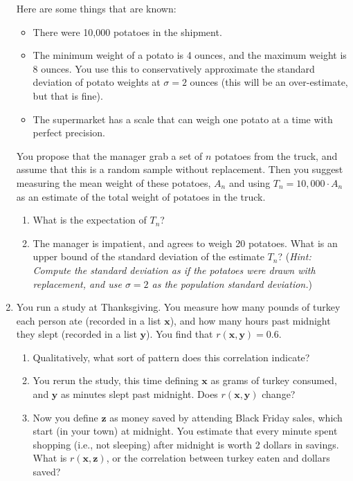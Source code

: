 \documentclass[11pt]{article}
\begin{document}
\begin{enumerate}
Here are some things that are known:
\begin{itemize}
\item There were 10,000 potatoes in the shipment.
\item The minimum weight of a potato is 4 ounces, and the maximum weight is 8 ounces. You use this to conservatively approximate the standard deviation of potato weights at $\sigma = 2$ ounces (this will be an over-estimate, but that is fine).
\item The supermarket has a scale that can weigh one potato at a time with perfect precision.
\end{itemize}

You propose that the manager grab a set of $n$ potatoes from the truck, and assume that this is a random sample without replacement. Then you suggest measuring the mean weight of these potatoes, $A_n$ and using $T_n = 10,000 \cdot A_n$ as an estimate of the total weight of potatoes in the truck.

\begin{enumerate}
\item What is the expectation of $T_n$?
\item The manager is impatient, and agrees to weigh 20 potatoes. What is an upper bound of the standard deviation of the estimate $T_n$? (\emph{Hint: Compute the standard deviation as if the potatoes were drawn with replacement, and use $\sigma = 2$ as the population standard deviation.})
\end{enumerate}

\item You run a study at Thanksgiving. You measure how many pounds of turkey each person ate (recorded in a list $\bm x$), and how many hours past midnight they slept (recorded in a list $\bm y$). You find that $r(\bm x, \bm y) = 0.6$.
\begin{enumerate}
\item Qualitatively, what sort of pattern does this correlation indicate?
\item You rerun the study, this time defining $\bm x$ as grams of turkey consumed, and $\bm y$ as minutes slept past midnight. Does $r(\bm x, \bm y)$ change?
\item Now you define $\bm z$ as money saved by attending Black Friday sales, which start (in your town) at midnight. You estimate that every minute spent shopping (i.e., not sleeping) after midnight is worth 2 dollars in savings. What is $r(\bm x, \bm z)$, or the correlation between turkey eaten and dollars saved?
\end{enumerate}
\end{enumerate}
\end{document}

